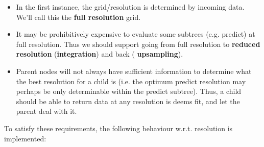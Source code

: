   \begin{itemize}
  
  \item In the first instance, the grid/resolution is determined by incoming
  data. We'll call this the {\bf full resolution} grid.

  \item It may be prohibitively expensive to evaluate some subtrees (e.g.
  predict) at full resolution. Thus we should support going from full
  resolution to {\bf reduced resolution} ({\bf integration}) and back ({\bf
  upsampling}). 

  \item Parent nodes will not always have sufficient information to determine
  what the best resolution for a child is (i.e. the optimum predict resolution
  may perhaps be only determinable within the predict subtree). Thus, a child
  should be able to  return data at any resolution is deems fit, and let the
  parent deal with it.

  \end{itemize}
  
  To satisfy these requirements, the following behaviour w.r.t. resolution
  is implemented:
  
